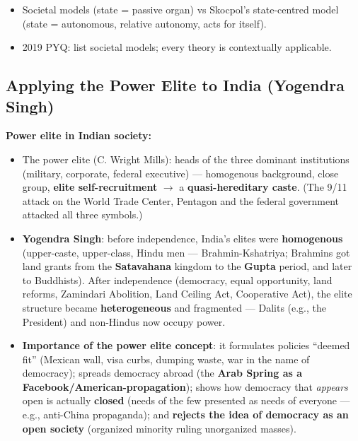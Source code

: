 \begin{QuickRevision}
\begin{itemize}
\item Societal models (state = passive organ) vs Skocpol's state-centred model (state = autonomous, relative autonomy, acts for itself).
\item 2019 PYQ: list societal models; every theory is contextually applicable.
\end{itemize}
\end{QuickRevision}

\sectiondivider

\subsection{Applying the Power Elite to India (Yogendra Singh)}

\begin{DataFact}
\textbf{Power elite in Indian society:}
\begin{itemize}
\item The power elite (C. Wright Mills): heads of the three dominant institutions (military, corporate, federal executive) --- homogenous background, close group, \textbf{elite self-recruitment} $\rightarrow$ a \textbf{quasi-hereditary caste}. (The 9/11 attack on the World Trade Center, Pentagon and the federal government attacked all three symbols.)
\item \textbf{Yogendra Singh}: before independence, India's elites were \textbf{homogenous} (upper-caste, upper-class, Hindu men --- Brahmin-Kshatriya; Brahmins got land grants from the \textbf{Satavahana} kingdom to the \textbf{Gupta} period, and later to Buddhists). After independence (democracy, equal opportunity, land reforms, Zamindari Abolition, Land Ceiling Act, Cooperative Act), the elite structure became \textbf{heterogeneous} and fragmented --- Dalits (e.g., the President) and non-Hindus now occupy power.
\item \textbf{Importance of the power elite concept}: it formulates policies ``deemed fit'' (Mexican wall, visa curbs, dumping waste, war in the name of democracy); spreads democracy abroad (the \textbf{Arab Spring as a Facebook/American-propagation}); shows how democracy that \textit{appears} open is actually \textbf{closed} (needs of the few presented as needs of everyone --- e.g., anti-China propaganda); and \textbf{rejects the idea of democracy as an open society} (organized minority ruling unorganized masses).
\end{itemize}
\end{DataFact}

